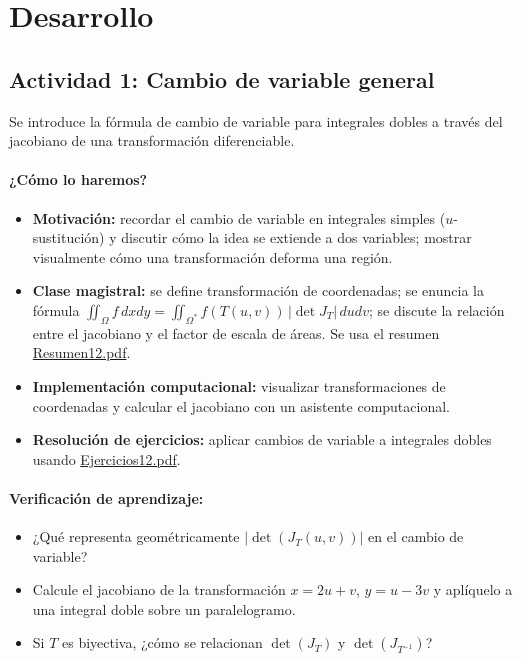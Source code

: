 \documentclass[a4,11pt]{aleph-notas}
\begin{document}
\section*{Desarrollo}

\subsection*{Actividad 1: Cambio de variable general}
Se introduce la fórmula de cambio de variable para integrales dobles a través del jacobiano de una transformación diferenciable.

\paragraph{¿Cómo lo haremos?}
\begin{itemize}[leftmargin=*]
    \item \textbf{Motivación:} recordar el cambio de variable en integrales simples ($u$-sustitución) y discutir cómo la idea se extiende a dos variables; mostrar visualmente cómo una transformación deforma una región.
    \item \textbf{Clase magistral:} se define transformación de coordenadas; se enuncia la fórmula $\iint_\Omega f\,dxdy = \iint_{\Omega^*} f(T(u,v))\,|\det J_T|\,dudv$; se discute la relación entre el jacobiano y el factor de escala de áreas. Se usa el resumen \href{https://andres-merino.github.io/MatematicaIII-05-N0051/01Resumen/Resumen12.pdf}{Resumen12.pdf}.
    \item \textbf{Implementación computacional:} visualizar transformaciones de coordenadas y calcular el jacobiano con un asistente computacional.
    \item \textbf{Resolución de ejercicios:} aplicar cambios de variable a integrales dobles usando \href{https://andres-merino.github.io/MatematicaIII-05-N0051/04Ejercicios/Ejercicios12.pdf}{Ejercicios12.pdf}.
\end{itemize}

\paragraph{Verificación de aprendizaje:}
\begin{itemize}[leftmargin=*]
    \item ¿Qué representa geométricamente $|\det(J_T(u,v))|$ en el cambio de variable?
    \item Calcule el jacobiano de la transformación $x=2u+v$, $y=u-3v$ y aplíquelo a una integral doble sobre un paralelogramo.
    \item Si $T$ es biyectiva, ¿cómo se relacionan $\det(J_T)$ y $\det(J_{T^{-1}})$?
\end{itemize}
\end{document}
